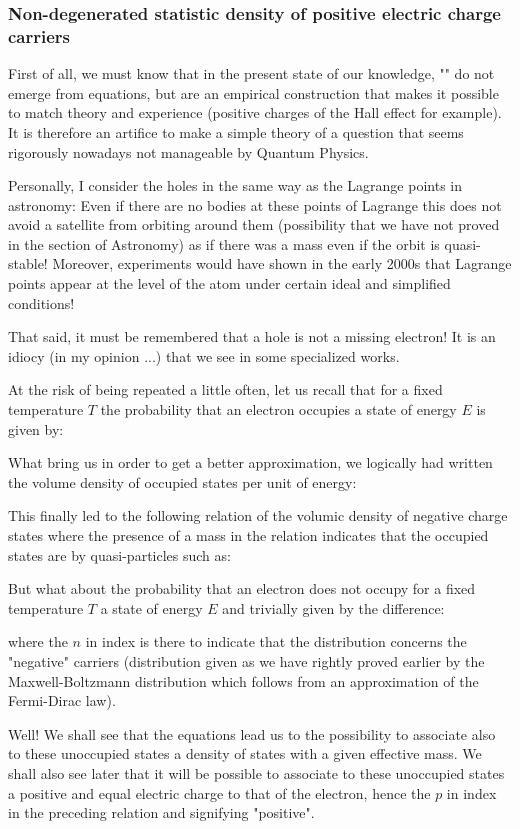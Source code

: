 	\subsubsection{Non-degenerated statistic density of positive electric charge carriers}
	First of all, we must know that in the present state of our knowledge, "" do not emerge from equations, but are an empirical construction that makes it possible to match theory and experience (positive charges of the Hall effect for example). It is therefore an artifice to make a simple theory of a question that seems rigorously nowadays not manageable by Quantum Physics.

	Personally, I consider the holes in the same way as the Lagrange points in astronomy: Even if there are no bodies at these points of Lagrange this does not avoid a satellite from orbiting around them (possibility that we have not proved in the section of Astronomy) as if there was a mass even if the orbit is quasi-stable! Moreover, experiments would have shown in the early 2000s that Lagrange points appear at the level of the atom under certain ideal and simplified conditions!

	That said, it must be remembered that a hole is not a missing electron! It is an idiocy (in my opinion ...) that we see in some specialized works.

	At the risk of being repeated a little often, let us recall that for a fixed temperature $T$ the probability that an electron occupies a state of energy $E$ is given by:
	
	What bring us in order to get a better approximation, we logically had written the volume density of occupied states per unit of energy:
	
	This finally led to the following relation of the volumic density of negative charge states where the presence of a mass in the relation indicates that the occupied states are by quasi-particles such as:
	
	But what about the probability that an electron does not occupy for a fixed temperature $T$ a state of energy $E$ and trivially given by the difference:
	
	where the $n$ in index is there to indicate that the distribution concerns the "negative" carriers (distribution given as we have rightly proved earlier by the Maxwell-Boltzmann distribution which follows from an approximation of the Fermi-Dirac law).
	
	Well! We shall see that the equations lead us to the possibility to associate also to these unoccupied states a density of states with a given effective mass. We shall also see later that it will be possible to associate to these unoccupied states a positive and equal electric charge to that of the electron, hence the $p$ in index in the preceding relation and signifying "positive".

